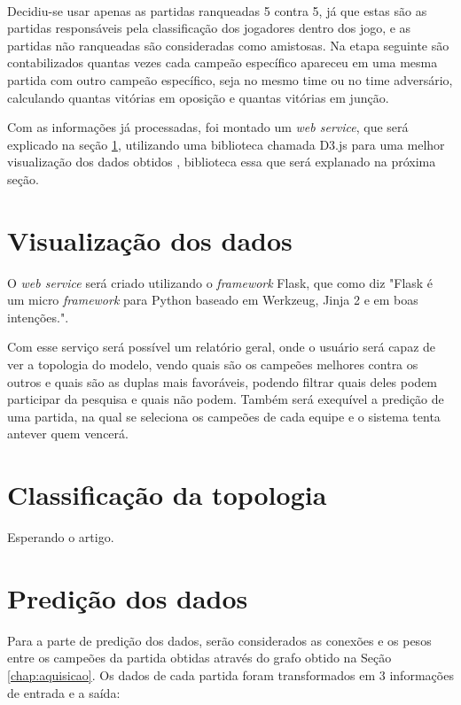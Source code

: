 \

Decidiu-se usar apenas as partidas ranqueadas 5 contra 5, já que estas são as partidas responsáveis pela classificação dos jogadores dentro dos jogo, e as partidas não ranqueadas são consideradas como amistosas.
Na etapa seguinte são contabilizados quantas vezes cada campeão específico apareceu em uma mesma partida com outro campeão específico, seja no mesmo time ou no time adversário, calculando quantas vitórias em oposição e quantas vitórias em junção.

Com as informações já processadas, foi montado um \textit{web service}, que será explicado na seção \ref{chap:web}, utilizando uma biblioteca chamada D3.js para uma melhor visualização dos dados obtidos , biblioteca essa que será explanado na próxima seção.

\section{Visualização dos dados}
\label{chap:web}

O \textit{web service} será criado utilizando o \textit{framework} Flask, que como \citet[tradução do autor]{flask} diz "Flask é um micro \textit{framework} para Python baseado em Werkzeug, Jinja 2 e em boas intenções.".

Com esse serviço será possível um relatório geral, onde o usuário será capaz de ver a topologia do modelo, vendo quais são os campeões melhores contra os outros e quais são as duplas mais favoráveis, podendo filtrar quais deles podem participar da pesquisa e quais não podem. 
Também será exequível a predição de uma partida, na qual se seleciona os campeões de cada equipe e o sistema tenta antever quem vencerá.



\section{Classificação da topologia}
\label{chap:topo}
Esperando o artigo.

\section{Predição dos dados}
\label{chap:pred}

Para a parte de predição dos dados, serão considerados as conexões e os pesos entre os campeões da partida obtidas através do grafo obtido na Seção \ref{chap:aquisicao}. Os dados de cada partida foram transformados em 3 informações de entrada e a saída:


